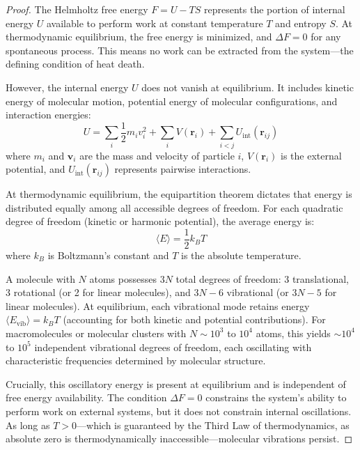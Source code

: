 \documentclass[12pt,a4paper]{article}
\theoremstyle{definition}
\theoremstyle{remark}
\begin{document}
\begin{proof}
The Helmholtz free energy $F = U - TS$ represents the portion of internal energy $U$ available to perform work at constant temperature $T$ and entropy $S$. At thermodynamic equilibrium, the free energy is minimized, and $\Delta F = 0$ for any spontaneous process. This means no work can be extracted from the system—the defining condition of heat death.

However, the internal energy $U$ does not vanish at equilibrium. It includes kinetic energy of molecular motion, potential energy of molecular configurations, and interaction energies:
\begin{equation}
U = \sum_i \frac{1}{2} m_i v_i^2 + \sum_i V(\mathbf{r}_i) + \sum_{i<j} U_{\text{int}}(\mathbf{r}_{ij})
\end{equation}
where $m_i$ and $\mathbf{v}_i$ are the mass and velocity of particle $i$, $V(\mathbf{r}_i)$ is the external potential, and $U_{\text{int}}(\mathbf{r}_{ij})$ represents pairwise interactions.

At thermodynamic equilibrium, the equipartition theorem dictates that energy is distributed equally among all accessible degrees of freedom. For each quadratic degree of freedom (kinetic or harmonic potential), the average energy is:
\begin{equation}
\langle E \rangle = \frac{1}{2} k_B T
\end{equation}
where $k_B$ is Boltzmann's constant and $T$ is the absolute temperature.

A molecule with $N$ atoms possesses $3N$ total degrees of freedom: 3 translational, 3 rotational (or 2 for linear molecules), and $3N - 6$ vibrational (or $3N - 5$ for linear molecules). At equilibrium, each vibrational mode retains energy $\langle E_{\text{vib}} \rangle = k_B T$ (accounting for both kinetic and potential contributions). For macromolecules or molecular clusters with $N \sim 10^3$ to $10^4$ atoms, this yields $\sim 10^4$ to $10^5$ independent vibrational degrees of freedom, each oscillating with characteristic frequencies determined by molecular structure.

Crucially, this oscillatory energy is present at equilibrium and is independent of free energy availability. The condition $\Delta F = 0$ constrains the system's ability to perform work on external systems, but it does not constrain internal oscillations. As long as $T > 0$—which is guaranteed by the Third Law of thermodynamics, as absolute zero is thermodynamically inaccessible—molecular vibrations persist.
\end{proof}
\end{document}

